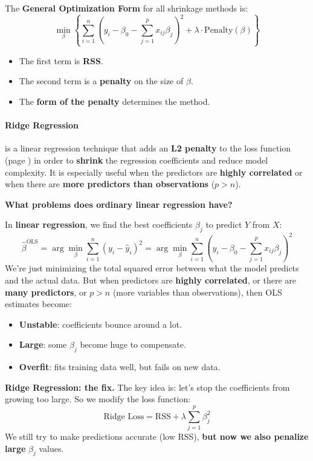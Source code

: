 \noindent
The \textbf{General Optimization Form} for all shrinkage methods is:
\begin{equation}
    \min_{\beta} \left\{ \sum_{i=1}^{n} (y_i - \beta_0 - \sum_{j=1}^{p} x_{ij} \beta_j)^2 + \lambda \cdot \text{Penalty}(\beta) \right\}
\end{equation}
\begin{itemize}
    \item The first term is \textbf{RSS}.
    \item The second term is a \textbf{penalty} on the size of $\beta$.
    \item The \textbf{form of the penalty} determines the method.
\end{itemize}

\newpage

\paragraph{Ridge Regression}\label{paragraph: Ridge Regression}

 is a linear regression technique that adds an \textbf{L2 penalty} to the loss function (page \pageref{def: Loss Function}) in order to \textbf{shrink} the regression coefficients and reduce model complexity. It is especially useful when the predictors are \textbf{highly correlated} or when there are \textbf{more predictors than observations} ($p > n$).

\begin{flushleft}
    \textcolor{Red2}{ \textbf{What problems does ordinary linear regression have?}}
\end{flushleft}
In \textbf{linear regression}, we find the best coefficients $\beta_j$ to predict $Y$ from $X$:
\begin{equation*}
    \hat{\beta}^{\text{OLS}} = \arg\min_{\beta} \sum_{i=1}^n (y_i - \hat{y}_i)^2 = \arg\min_{\beta} \sum_{i=1}^n (y_i - \beta_0 - \sum_{j=1}^p x_{ij} \beta_j)^2
\end{equation*}
We're just minimizing the total squared error between what the model predicts and the actual data. But when predictors are \textbf{highly correlated}, or there are \textbf{many predictors}, or $p > n$ (more variables than observations), then OLS estimates become:
\begin{itemize}[label=\textcolor{Red2}{}]
    \item \textbf{Unstable}: coefficients bounce around a lot.
    \item \textbf{Large}: some $\beta_j$ become huge to compensate.
    \item \textbf{Overfit}: fits training data well, but fails on new data.
\end{itemize}
\textcolor{Green3}{ \textbf{Ridge Regression: the fix.}} The key idea is: let's stop the coefficients from growing too large. So we modify the loss function:
\begin{equation*}
    \text{Ridge Loss} = \text{RSS} + \lambda \sum_{j=1}^p \beta_j^2
\end{equation*}
We still try to make predictions accurate (low RSS), \textbf{but now we also penalize large} $\beta_j$ values.

